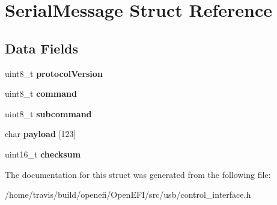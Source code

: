 \hypertarget{structSerialMessage}{}\section{Serial\+Message Struct Reference}
\label{structSerialMessage}
\subsection*{Data Fields}
\begin{DoxyCompactItemize}
\item 
\mbox{\label{structSerialMessage_aa41cdf6c9d8001119b5be27070271b98}} 
uint8\+\_\+t {\bfseries protocol\+Version}
\item 
\mbox{\label{structSerialMessage_a71592aeef849dda1b4e5fddbb739607b}} 
uint8\+\_\+t {\bfseries command}
\item 
\mbox{\label{structSerialMessage_a5417ab8ac06f6d763b4c3edf398e8319}} 
uint8\+\_\+t {\bfseries subcommand}
\item 
\mbox{\label{structSerialMessage_a14f2756e0f5ed02b81b3c6efd55b579e}} 
char {\bfseries payload} \mbox{[}123\mbox{]}
\item 
\mbox{\label{structSerialMessage_aaa01e1797fe94805deb1cc04dc2a7c6a}} 
uint16\+\_\+t {\bfseries checksum}
\end{DoxyCompactItemize}


The documentation for this struct was generated from the following file\+:\begin{DoxyCompactItemize}
\item 
/home/travis/build/openefi/\+Open\+E\+F\+I/src/usb/control\+\_\+interface.\+h\end{DoxyCompactItemize}
